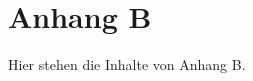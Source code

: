 \chapter{Anhang B}
\label{cha:anhang_B}

\renewcommand*{\thepage}{B-\arabic{page}} %

Hier stehen die Inhalte von Anhang B.